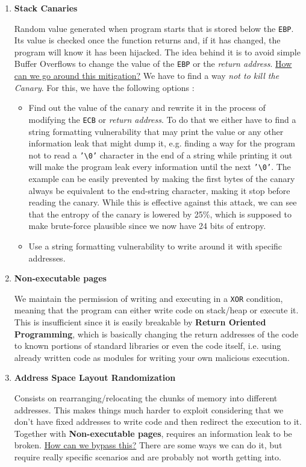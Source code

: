 \documentclass[11pt]{article}
\begin{document}
\begin{enumerate}
\item \textbf{Stack Canaries}
\label{sec:orgb7b6927}

Random value generated when program starts that is stored below the \texttt{EBP}. Its value is checked once the function returns and, if it has changed, the program will know it has been hijacked. The idea behind it is to avoid simple Buffer Overflows to change the value of the \texttt{EBP} or the \emph{return address}. \uline{How can we go around this mitigation?} We have to find a way \emph{not to kill the Canary}. For this, we have the following options :
\begin{itemize}
\item Find out the value of the canary and rewrite it in the process of modifying the \texttt{ECB} or \emph{return address}. To do that we either have to find a string formatting vulnerability that may print the value or any other information leak that might dump it, e.g. finding a way for the program not to read a \texttt{'\textbackslash{}0'} character in the end of a string while printing it out will make the program leak every information until the next \texttt{'\textbackslash{}0'}. The example can be easily prevented by making the first bytes of the canary always be equivalent to the end-string character, making it stop before reading the canary. While this is effective against this attack, we can see that the entropy of the canary is lowered by 25\%, which is supposed to make brute-force plausible since we now have 24 bits of entropy.
\item Use a string formatting vulnerability to write around it with specific addresses.
\end{itemize}

\item \textbf{Non-executable pages}
\label{sec:org98f786a}

We maintain the permission of writing and executing in a \texttt{XOR} condition, meaning that the program can either write code on stack/heap or execute it. This is insufficient since it is easily breakable by \textbf{Return Oriented Programming}, which is basically changing the return addresses of the code to known portions of standard libraries or even the code itself, i.e. using already written code as modules for writing your own malicious execution.

\item \textbf{Address Space Layout Randomization}
\label{sec:orge04b036}

Consists on rearranging/relocating the chunks of memory into different addresses. This makes things much harder to exploit considering that we don't have fixed addresses to write code and then redirect the execution to it. Together with \textbf{Non-executable pages}, requires an information leak to be broken. \uline{How can we bypass this?} There are some ways we can do it, but require really specific scenarios \cite{muller_aslr_nodate} and are probably not worth getting into.
\end{enumerate}
\end{document}
